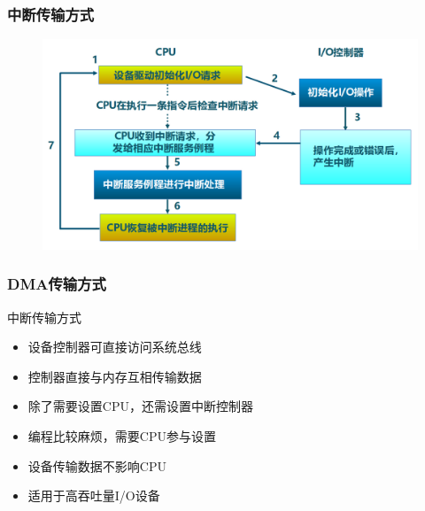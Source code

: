 \begin{frame}[fragile]
    \frametitle{中断传输方式}
        \begin{figure}
            \includegraphics[width=0.8\linewidth]{figs/interrupt-steps.png}
        \end{figure}
\end{frame}
\begin{frame}[fragile]
    \frametitle{DMA传输方式}
    中断传输方式
    \begin{itemize}
        \item 设备控制器可直接访问系统总线
        \item 控制器直接与内存互相传输数据
        \item 除了需要设置CPU，还需设置中断控制器
        \item 编程比较麻烦，需要CPU参与设置
        \item 设备传输数据不影响CPU
        \item 适用于高吞吐量I/O设备
    \end{itemize}
\end{frame}
